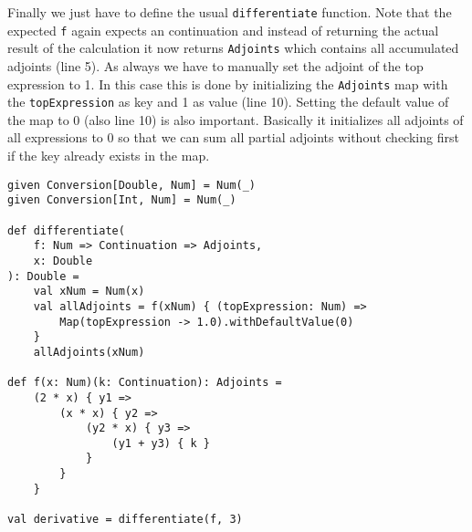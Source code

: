 Finally we just have to define the usual \lstinline{differentiate} function. Note that the expected \lstinline{f} again expects an continuation and instead of returning the actual result of the calculation it now returns \lstinline{Adjoints} which contains all accumulated adjoints (line 5). As always we have to manually set the adjoint of the top expression to 1. In this case this is done by initializing the \lstinline{Adjoints} map with the \lstinline{topExpression} as key and 1 as value (line 10). Setting the default value of the map to 0 (also line 10) is also important. Basically it initializes all adjoints of all expressions to 0 so that we can sum all partial adjoints without checking first if the key already exists in the map.
\begin{lstlisting}
given Conversion[Double, Num] = Num(_)
given Conversion[Int, Num] = Num(_)

def differentiate(
    f: Num => Continuation => Adjoints, 
    x: Double
): Double =
    val xNum = Num(x)
    val allAdjoints = f(xNum) { (topExpression: Num) =>
        Map(topExpression -> 1.0).withDefaultValue(0)
    }
    allAdjoints(xNum)

def f(x: Num)(k: Continuation): Adjoints =
    (2 * x) { y1 =>
        (x * x) { y2 =>
            (y2 * x) { y3 =>
                (y1 + y3) { k }
            }
        }
    }

val derivative = differentiate(f, 3)
\end{lstlisting}